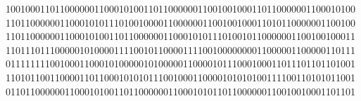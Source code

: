 \documentclass[preview]{standalone}
\begin{document}
\begin{center}
10010001101100000011000101001101100000011001001000110110000001100010100 11011000000110001010111010010000110000001100100100011010110000001100100 11011000000110001010011011000000110001010111010010110000001100100100011 11011101110000010100001111001011000011110010000000011000001100000110111 01111111100100011000101000001010000011000010111000100011011101101101001 11010110011000011011000101010111001000110000101010100111100110101011001 01101100000011000101001101100000011000101011011000000110010010001101101
\end{center}
\end{document}
